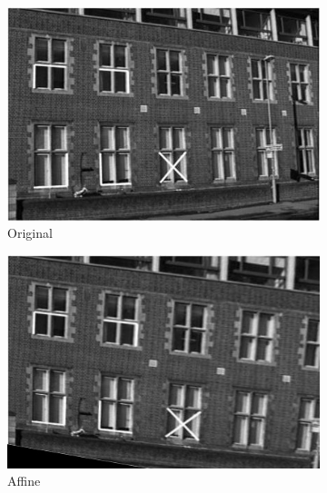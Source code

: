 \documentclass[paper=a4, fontsize=11pt]{scrartcl} %
\begin{document}
\begin{figure}
    \centering
    \begin{subfigure}[ht]{0.3\textwidth}
        \centering
        \includegraphics[width=\textwidth]{figures/img16.jpg}
        \caption{Original\label{fig:img16_tile}}    
    \end{subfigure}
    \hfill
    \begin{subfigure}[ht]{0.3\textwidth}  
        \centering 
        \includegraphics[width=\textwidth]{figures/img16_aff.jpg}
        \caption{Affine\label{fig:img16_aff}}    
    \end{subfigure}
    \hfill
    \begin{subfigure}[ht]{0.3\textwidth}   
        \centering 

\end{subfigure}
\end{figure}
\end{document}
